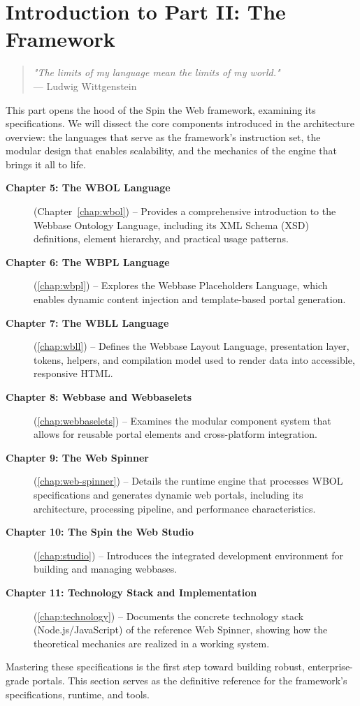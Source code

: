 
\chapter*{Introduction to Part II: The Framework}
\label{part:framework}

\begin{quote}
\textit{"The limits of my language mean the limits of my world."} \\
— Ludwig Wittgenstein
\end{quote}

This part opens the hood of the Spin the Web framework, examining its specifications. We will dissect the core components introduced in the architecture overview: the languages that serve as the framework's instruction set, the modular design that enables scalability, and the mechanics of the engine that brings it all to life.

\begin{description}
\item[\textbf{Chapter 5: The WBOL Language}] (Chapter~\ref{chap:wbol}) -- Provides a comprehensive introduction to the Webbase Ontology Language, including its XML Schema (XSD) definitions, element hierarchy, and practical usage patterns.

\item[\textbf{Chapter 6: The WBPL Language}] (\cref{chap:wbpl}) -- Explores the Webbase Placeholders Language, which enables dynamic content injection and template-based portal generation.

\item[\textbf{Chapter 7: The WBLL Language}] (\cref{chap:wbll}) -- Defines the Webbase Layout Language, presentation layer, tokens, helpers, and compilation model used to render data into accessible, responsive HTML.

\item[\textbf{Chapter 8: Webbase and Webbaselets}] (\cref{chap:webbaselets}) -- Examines the modular component system that allows for reusable portal elements and cross-platform integration.

\item[\textbf{Chapter 9: The Web Spinner}] (\cref{chap:web-spinner}) -- Details the runtime engine that processes WBOL specifications and generates dynamic web portals, including its architecture, processing pipeline, and performance characteristics.

\item[\textbf{Chapter 10: The Spin the Web Studio}] (\cref{chap:studio}) -- Introduces the integrated development environment for building and managing webbases.

\item[\textbf{Chapter 11: Technology Stack and Implementation}] (\cref{chap:technology}) -- Documents the concrete technology stack (Node.js/JavaScript) of the reference Web Spinner, showing how the theoretical mechanics are realized in a working system.
\end{description}

Mastering these specifications is the first step toward building robust, enterprise-grade portals. This section serves as the definitive reference for the framework's specifications, runtime, and tools.
